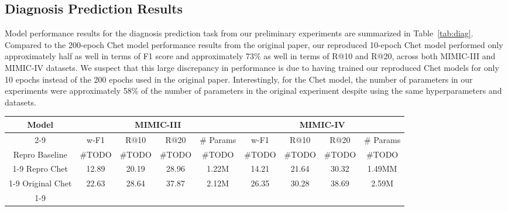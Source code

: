 \documentclass[11pt,a4paper,fleqn]{article}
\begin{document}
\subsection{Diagnosis Prediction Results}
Model performance results for the diagnosis prediction task from our preliminary experiments are summarized in Table~\ref{tab:diag}. 
Compared to the 200-epoch Chet model performance results from the original paper, our reproduced 10-epoch Chet 
model performed only approximately half as well in terms of F1 score and approximately 73\% as well in terms of R@10 and R@20, 
across both MIMIC-III and MIMIC-IV datasets. We suspect that this large discrepancy in performance is due to 
having trained our reproduced Chet models for only 10 epochs instead of the 200 epochs used in the original paper.
Interestingly, for the Chet model, the number of parameters in our experiments were approximately 58\% of the number of parameters in the 
original experiment despite using the same hyperparameters and datasets.
\begin{table*}[ht]
  \centering
  \begin{tabular}{|ccccc|cccc|} \hline
    {Model} & \multicolumn{4}{c|}{MIMIC-III} & \multicolumn{4}{c|}{MIMIC-IV} \\ \cline{2-9} 
    & w-F1 & R@10 & R@20 & \# Params & w-F1 & R@10 & R@20 & \# Params \\ \hline
    {Repro Baseline} & \#TODO & \#TODO & \#TODO & \#TODO & \#TODO & \#TODO & \#TODO & \#TODO \\ \cline{1-9}
    {Repro Chet} & 12.89 & 20.19 & 28.96 & 1.22M & 14.21 & 21.64 & 30.32 & 1.49MM \\ \cline{1-9}
    {Original Chet} & 22.63 & 28.64 & 37.87 & 2.12M & 26.35 & 30.28 & 38.69 & 2.59M \\ \cline{1-9}
  \end{tabular}
  \caption{Diagnosis prediction results on MIMIC-III and MIMIC-IV using w-F1 (\%) and R@k (\%).}
  \label{tab:diag}
  \end{table*}
\end{document}
